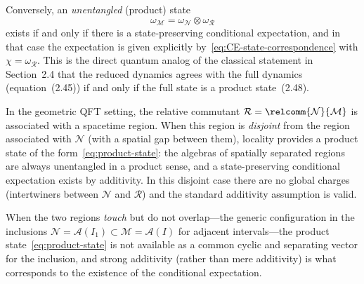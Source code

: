 \documentclass[a4paper,11pt]{article}
\theoremstyle{definition}
\begin{document}
Conversely, an \emph{unentangled} (product) state
\begin{equation}
  \omega_\mathcal{M} = \omega_\mathcal{N}\otimes\omega_\mathcal{R}
  \label{eq:product-state}
\end{equation}
exists if and only if there is a state-preserving conditional expectation, and in that case
the expectation is given explicitly by~\eqref{eq:CE-state-correspondence} with
$\chi=\omega_\mathcal{R}$.  This is the direct quantum analog of the classical statement
in Section~2.4 that the reduced dynamics agrees with the full dynamics (equation~(2.45))
if and only if the full state is a product state~(2.48).

In the geometric QFT setting, the relative commutant $\mathcal{R}=\relcomm{\mathcal{N}}{\mathcal{M}}$
is associated with a spacetime region.  When this region is \emph{disjoint} from the
region associated with $\mathcal{N}$ (with a spatial gap between them), locality provides
a product state of the form~\eqref{eq:product-state}: the algebras of spatially separated
regions are always unentangled in a product sense, and a state-preserving conditional
expectation exists by additivity.  In this disjoint case there are no global charges
(intertwiners between $\mathcal{N}$ and $\mathcal{R}$) and the standard additivity
assumption is valid.

When the two regions \emph{touch} but do not overlap---the generic configuration in the
inclusions $\mathcal{N}=\mathcal{A}(I_1)\subset\mathcal{M}=\mathcal{A}(I)$ for adjacent
intervals---the product state~\eqref{eq:product-state} is not available as a common cyclic
and separating vector for the inclusion, and strong additivity (rather than mere additivity)
is what corresponds to the existence of the conditional expectation.
\end{document}
